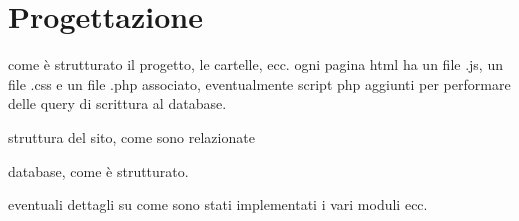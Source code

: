 \section{Progettazione}
\label{sec:progettazione}

come è strutturato il progetto, le cartelle, ecc.
ogni pagina html ha un file .js, un file .css e un file .php associato, eventualmente script php aggiunti per performare delle query di scrittura al database.

struttura del sito, come sono relazionate

database, come è strutturato.

eventuali dettagli su come sono stati implementati i vari moduli ecc.
